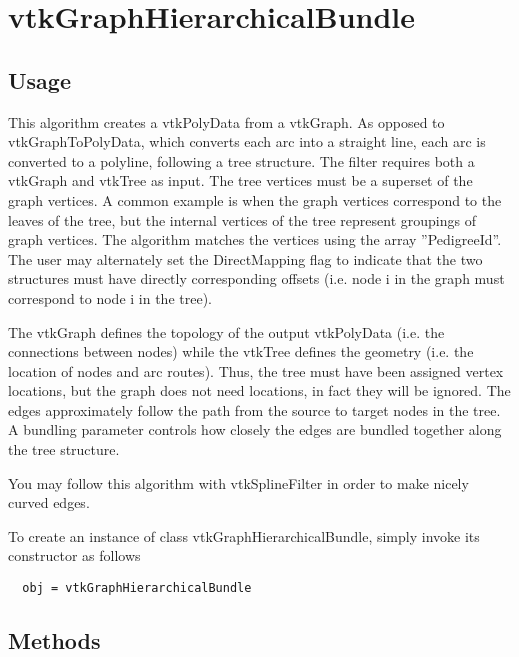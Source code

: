 \section{vtkGraphHierarchicalBundle}

\subsection{Usage}

 This algorithm creates a vtkPolyData from a vtkGraph.  As opposed to
 vtkGraphToPolyData, which converts each arc into a straight line, each arc
 is converted to a polyline, following a tree structure.  The filter requires
 both a vtkGraph and vtkTree as input.  The tree vertices must be a
 superset of the graph vertices.  A common example is when the graph vertices
 correspond to the leaves of the tree, but the internal vertices of the tree
 represent groupings of graph vertices.  The algorithm matches the vertices
 using the array ''PedigreeId''.  The user may alternately set the
 DirectMapping flag to indicate that the two structures must have directly
 corresponding offsets (i.e. node i in the graph must correspond to node i in
 the tree).

 The vtkGraph defines the topology of the output vtkPolyData (i.e.
 the connections between nodes) while the vtkTree defines the geometry (i.e.
 the location of nodes and arc routes).  Thus, the tree must have been
 assigned vertex locations, but the graph does not need locations, in fact
 they will be ignored.  The edges approximately follow the path from the
 source to target nodes in the tree.  A bundling parameter controls how
 closely the edges are bundled together along the tree structure.
 
 You may follow this algorithm with vtkSplineFilter in order to make nicely
 curved edges.

To create an instance of class vtkGraphHierarchicalBundle, simply
invoke its constructor as follows
\begin{verbatim}
  obj = vtkGraphHierarchicalBundle
\end{verbatim}
\subsection{Methods}

